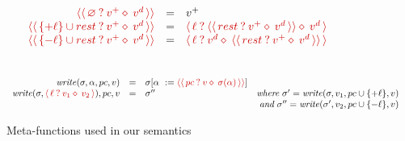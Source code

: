 \documentclass[review=true,acmlarge]{acmart}
\newcommand{\colorFAC}{black!20!red}
\newcommand{\fcol}[1] {{\color{\colorFAC} #1}}
\newcommand{\facet}[3]{{\fcol{\ensuremath{\langle \, {#1} \: ? \: {#2} \diamond \: {#3} \, \rangle}}}}
\newcommand{\formfacet}[3]{{\fcol{\ensuremath{\langle \langle \, {#1} \: ? \: {#2} \diamond \: {#3} \,  \rangle \rangle}}}}
\newcommand{\var}[1]{\mathit{#1}}
\begin{document}
\begin{figure}
      \begin{displaymath}
        \begin{array}{rclrr}
          {\formfacet{\varnothing}{v^+}{v^d}} & {=} & {v^+} \\
          {\formfacet{\{+\ell\} \cup rest}{v^+}{v^d}} & {=} & {\facet{\ell}{\formfacet{rest}{v^+}{v^d}}{v^d}} \\
          {\formfacet{\{-\ell\} \cup rest}{v^+}{v^d}} & {=} & {\facet{\ell}{v^d}{\formfacet{rest}{v^+}{v^d}}}
        \end{array}
      \end{displaymath}
      \\
      \begin{displaymath}
        \begin{array}{rclrr}
          {\var{write}(\sigma, \alpha, pc, v)} & {=} & {\sigma[\alpha ~ := \formfacet{pc}{v}{\sigma(\alpha)}]} & & \\
          {\var{write}(\sigma, \facet{\ell}{v_1}{v_2}), pc, v} & = & {\sigma''} & \textit{where} ~ {\sigma' = \var{write}(\sigma, v_1, pc \cup \{+\ell\}, v)} \\
          & & & \textit{and} ~ {\sigma'' = \var{write}(\sigma', v_2, pc \cup \{-\ell\}, v)}
        \end{array}
      \end{displaymath}
      \caption{Meta-functions used in our semantics}
      \label{fig:metafunctions}
\end{figure}
\end{document}
